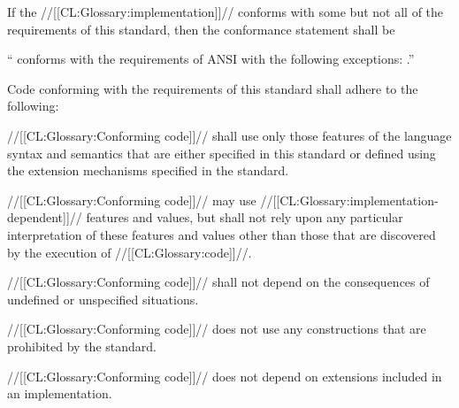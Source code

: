 If the //[[CL:Glossary:implementation]]// conforms with some but not all of the requirements of this
standard, then the conformance statement shall be
 
\beginlist
\item{} `` conforms with the requirements of
	  ANSI  with the following exceptions: 
	  .''
\endlist 
 
\endsubsubsection%

\endsubSection%


Code conforming with the requirements of this standard shall adhere to the
following:

\beginlist
  //[[CL:Glossary:Conforming code]]// shall use only those features of the
               language syntax and semantics that are 
	       either specified in this standard
		   or defined using the extension mechanisms 
		      specified in the standard.







 





 //[[CL:Glossary:Conforming code]]// may use
	      //[[CL:Glossary:implementation-dependent]]// features and values, 
	      but shall not rely upon
	      any particular interpretation of these features and values 
	      other than those that are discovered by the execution of //[[CL:Glossary:code]]//.

 //[[CL:Glossary:Conforming code]]// shall not depend on the consequences
	      of undefined or unspecified situations.

 //[[CL:Glossary:Conforming code]]// does not use any constructions 
	      that are prohibited by the standard.

 //[[CL:Glossary:Conforming code]]// does not depend on extensions 
	      included in an implementation.
\endlist 










































